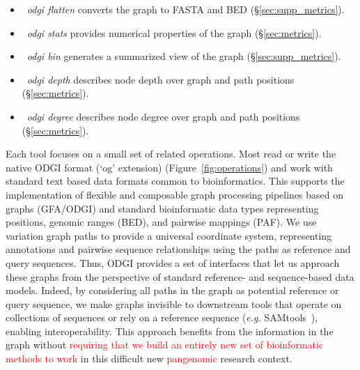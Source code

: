 \documentclass{bioinfo}
\newcommand{\REVIEWED}[1]{{\textcolor{Red}{#1}}}
\begin{document}
\begin{itemize}
\item~\textit{odgi flatten} converts the graph to FASTA and BED (\S\ref{sec:supp_metrics}).
\item~\textit{odgi stats} provides numerical properties of the graph (\S\ref{sec:metrics}).
\item~\textit{odgi bin} generates a summarized view of the graph (\S\ref{sec:supp_metrics}).
\item~\textit{odgi depth} describes node depth over graph and path positions (\S\ref{sec:metrics}).
\item~\textit{odgi degree} describes node degree over graph and path positions (\S\ref{sec:metrics}).
\end{itemize}

Each tool focuses on a small set of related operations.
Most read or write the native ODGI format (`og' extension) (Figure~\ref{fig:operations}) and work with standard text based data formats common to bioinformatics.
This supports the implementation of flexible and composable graph processing pipelines based on graphs (GFA/ODGI) and standard bioinformatic data types representing positions, genomic ranges (BED), and pairwise mappings (PAF).
We use variation graph paths to provide a universal coordinate system, representing annotations and pairwise sequence relationships using the paths as reference and query sequences.
Thus, ODGI provides a set of interfaces that let us approach these graphs from the perspective of standard reference- and sequence-based data models.
Indeed, by considering all paths in the graph as potential reference or query sequence, we make graphs invisible to downstream tools that operate on collections of sequences or rely on a reference sequence (\textit{e.g.} SAMtools~\citep{Li2009}), enabling interoperability.
This approach benefits from the information in the graph without \REVIEWED{requiring that we build an entirely new set of bioinformatic methods to work} in this difficult new \REVIEWED{pangenomic} research context.
\end{document}
